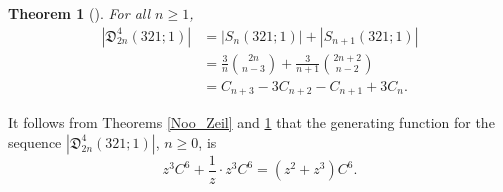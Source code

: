 \documentclass[
final
]{dmtcs-episciences}
\newtheorem{theorem}{Theorem}[section]%
\theoremstyle{definition}
\theoremstyle{remark}
\begin{document}
%
%
%

\begin{theorem}[\cite{Burstein_Jones}] \label{thm:d4-321-1}
For all $n\ge 1$,
\[
\begin{aligned}
|\mathfrak{D}^4_{2n} (321;1)| &= |S_n (321;1)| + |S_{n+1} (321;1)|\\
&= \frac{3}{n}\binom{2n}{n-3}+\frac{3}{n+1}\binom{2n+2}{n-2}\\
&= C_{n+3} - 3C_{n+2} - C_{n+1} + 3C_n.
\end{aligned}
\]
\end{theorem}

It follows from Theorems \ref{Noo_Zeil} and \ref{thm:d4-321-1} that the generating function for the sequence $|\mathfrak{D}^4_{2n}(321;1)|$, $n\ge 0$, is
\[
z^3 C^6 + \frac{1}{z}\cdot z^3 C^6 = (z^2+z^3)C^6.
\]
\end{document}
